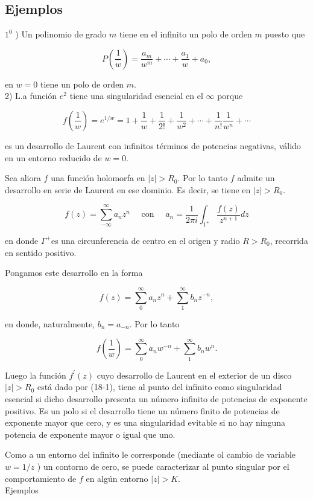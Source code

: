 \documentclass[10pt]{article}
\theoremstyle{plain}
\theoremstyle{definition}
\theoremstyle{remark}
\begin{document}
\subsection*{Ejemplos}
$1^{0}$ ) Un polinomio de grado $m$ tiene en el infinito un polo de orden $m$ puesto que

$$
P\left(\frac{1}{w}\right)=\frac{a_{m}}{w^{m}}+\cdots+\frac{a_{1}}{w}+a_{0},
$$

en $w=0$ tiene un polo de orden $m$.\\
2) L.a función $e^{2}$ tiene una singularidad esencial en el $\infty$ porque

$$
f\left(\frac{1}{w}\right)=e^{1 / w}=1+\frac{1}{w}+\frac{1}{2!}+\frac{1}{w^{2}}+\cdots+\frac{1}{n!} \frac{1}{w^{n}}+\cdots
$$

es un desarrollo de Laurent con infinitos términos de potencias negativas, válido en un entorno reducido de $w=0$.

Sea aliora $f$ una función holomorfa en $|z|>R_{0}$. Por lo tanto $f$ admite un desarrollo en serie de Laurent en ese dominio. Es decir, se tiene en $|z|>R_{0}$.

$$
f(z)=\sum_{-\infty}^{\infty} a_{n} z^{n} \quad \text { con } \quad a_{n}=\frac{1}{2 \pi i} \int_{1^{+}} \frac{f(z)}{z^{n+1}} d z
$$

en donde $\Gamma^{+}$es una circunferencia de centro en el origen y radio $R>R_{0}$, recorrida en sentido positivo.

Pongamos este desarrollo en la forma


\begin{equation*}
f(z)=\sum_{0}^{\infty} a_{n} z^{n}+\sum_{1}^{\infty} b_{n} z^{-n}, \tag{18-1}
\end{equation*}


en donde, naturalmente, $b_{n}=a_{-n}$. Por lo tanto

$$
f\left(\frac{1}{w}\right)=\sum_{0}^{\infty} a_{n} w^{-n}+\sum_{1}^{\infty} b_{n} w^{n} .
$$

Luego la función $f^{\prime}(z)$ cuyo desarrollo de Laurent en el exterior de un disco $|z|>R_{0}$ está dado por (18-1), tiene al punto del infinito como singularidad esencial si dicho desarrollo presenta un número infinito de potencias de exponente positivo. Es un polo si el desarrollo tiene un número finito de potencias de exponente mayor que cero, y es una singularidad evitable si no hay ninguna potencia de exponente mayor o igual que uno.

Como a un entorno del infinito le corresponde (mediante ol cambio de variable $w=1 / z$ ) un contorno de cero, se puede caracterizar al punto singular por el comportamiento de $f$ en algún entorno $|z|>K$.\\
Ejemplos
\end{document}
